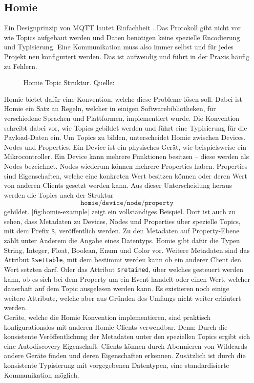 \subsection{Homie}
\label{subs:homie}

Ein Designprinzip von MQTT lautet Einfachheit \cite{mqtt-design-principles}. 
Das Protokoll gibt nicht vor wie Topics aufgebaut werden und Daten benötigen keine spezielle
Encodierung und Typisierung. Eine Kommunikation muss also immer selbst und
für jedes Projekt neu konfiguriert werden. Das ist aufwendig und führt in der 
Praxis häufig zu Fehlern.\\

\begin{figure}
  
  \caption{Homie Topic Struktur. Quelle: \cite{homie}}
  \label{fig:homie-example}
\end{figure}

Homie \cite{homie} bietet dafür eine Konvention, welche diese Probleme lösen soll. Dabei ist Homie
ein Satz an Regeln, welcher in einigen Softwarebibliotheken, für verschiedene
Sprachen und Plattformen, implementiert wurde. Die Konvention schreibt dabei vor, wie Topics 
gebildet werden und führt eine Typisierung für die Payload-Daten ein.
Um Topics zu bilden, unterscheidet Homie zwischen Devices, Nodes und Properties. Ein Device
ist ein physisches Gerät, wie beispielsweise ein Mikrocontroller.
Ein Device kann mehrere Funktionen besitzen -- diese werden als Nodes
bezeichnet. Nodes wiederum können mehrere Properties haben. Properties sind Eigenschaften, welche 
eine konkreten Wert besitzen können oder deren Wert von anderen Clients gesetzt werden kann.
Aus dieser Unterscheidung heraus werden die Topics nach der Struktur
\[\texttt{homie/device/node/property} \]
gebildet. \autoref{fig:homie-example} zeigt ein vollständiges Beispiel. Dort ist auch zu sehen, dass 
Metadaten zu Devices, Nodes und Properties über spezielle Topics, mit dem Prefix \texttt{\$},
veröffentlich werden. Zu den Metadaten auf Property-Ebene zählt unter Anderem die Angabe eines
Datentyps. Homie gibt dafür die Typen String, Integer, Float, Boolean, Enum und Color vor.
Weitere Metadaten sind das Attribut \texttt{\$settable}, mit dem bestimmt werden kann
ob ein anderer Client den Wert setzten darf. Oder das Attribut \texttt{\$retained}, über 
welches gesteuert werden kann, ob es sich bei dem Property um ein Event handelt oder einen Wert,
welcher dauerhaft auf dem Topic ausgelesen werden kann. Es existieren noch einige weitere Attribute,
welche aber aus Gründen des Umfangs nicht weiter erläutert werden.\\
Geräte, welche die Homie Konvention implementieren, sind praktisch konfigurationslos mit anderen
Homie Clients verwendbar. Denn: Durch die konsistente Veröffentlichung der Metadaten unter 
den speziellen Topics ergibt sich eine Autodiscovery-Eigenschaft. Clients können durch Abonnieren
von Wildcards andere Geräte finden und deren Eigenschaften erkennen. Zusätzlich ist durch die
konsistente Typisierung mit vorgegebenen Datentypen, eine standardisierte Kommunikation möglich. 

